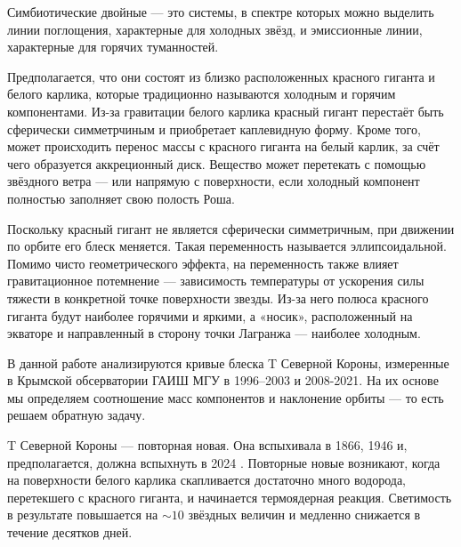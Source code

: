 

\usepackage{microtype}
\usepackage[extdef]{delimset}
\usepackage{csquotes} %
\usepackage{ragged2e}
\usepackage[hidelinks]{hyperref}
\usepackage{subfig}
\usepackage{tabularray}
\usepackage{epigraph}


\renewcommand{\div}{\operatorname{div}}




\setcounter{page}{2}




Симбиотические двойные — это системы, в спектре которых можно выделить линии поглощения, характерные для холодных звёзд, и эмиссионные линии, характерные для горячих туманностей.

Предполагается, что они состоят из близко расположенных красного гиганта и белого карлика, которые традиционно называются холодным и горячим компонентами. Из-за гравитации белого карлика красный гигант перестаёт быть сферически симметрчиным и приобретает каплевидную форму. Кроме того, может происходить перенос массы с красного гиганта на белый карлик, за счёт чего образуется аккреционный диск. Вещество может перетекать с помощью звёздного ветра --- или напрямую с поверхности, если холодный компонент полностью заполняет свою полость Роша.

Поскольку красный гигант не является сферически симметричным, при движении по орбите его блеск меняется. Такая переменность называется эллипсоидальной. Помимо чисто геометрического эффекта, на переменность также влияет гравитационное потемнение --- зависимость температуры от ускорения силы тяжести в конкретной точке поверхности звезды. Из-за него полюса красного гиганта будут наиболее горячими и яркими, а «носик», расположенный на экваторе и направленный в сторону точки Лагранжа --- наиболее холодным.

В данной работе анализируются кривые блеска T Северной Короны, измеренные в Крымской обсерватории ГАИШ МГУ в 1996--2003 и 2008-2021. На их основе мы определяем соотношение масс компонентов и наклонение орбиты — то есть решаем обратную задачу.

T Северной Короны --- повторная новая. Она вспыхивала в 1866, 1946 и, предполагается, должна вспыхнуть в 2024 \cite{OutburstAnnounce}. Повторные новые возникают, когда на поверхности белого карлика скапливается достаточно много водорода, перетекшего с красного гиганта, и начинается термоядерная реакция. Светимость в результате повышается на ${\sim} 10$ звёздных величин и медленно снижается в течение десятков дней.

